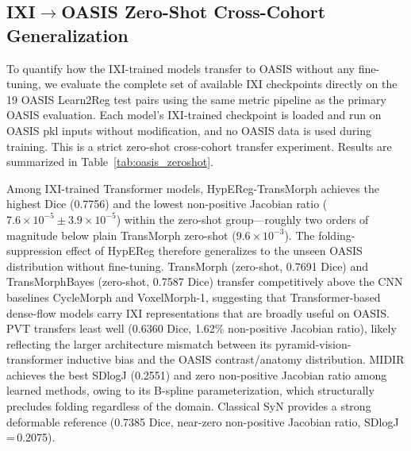 \documentclass[jimaging,article,submit,pdftex,moreauthors]{Definitions/mdpi}
\begin{document}
\begin{table}[H]
\end{table}

\subsection{IXI\texorpdfstring{\(\to\)}{→}OASIS Zero-Shot Cross-Cohort Generalization}\label{sec:oasis_zs}
To quantify how the IXI-trained models transfer to OASIS without any fine-tuning, we evaluate the complete set of available IXI checkpoints directly on the 19 OASIS Learn2Reg test pairs using the same metric pipeline as the primary OASIS evaluation. Each model's IXI-trained checkpoint is loaded and run on OASIS pkl inputs without modification, and no OASIS data is used during training. This is a strict zero-shot cross-cohort transfer experiment. Results are summarized in Table~\ref{tab:oasis_zeroshot}.

Among IXI-trained Transformer models, HypEReg-TransMorph achieves the highest Dice (0.7756) and the lowest non-positive Jacobian ratio (\(7.6\times10^{-5}\pm3.9\times10^{-5}\)) within the zero-shot group---roughly two orders of magnitude below plain TransMorph zero-shot (\(9.6\times10^{-3}\)). The folding-suppression effect of HypEReg therefore generalizes to the unseen OASIS distribution without fine-tuning. TransMorph (zero-shot, 0.7691 Dice) and TransMorphBayes (zero-shot, 0.7587 Dice) transfer competitively above the CNN baselines CycleMorph and VoxelMorph-1, suggesting that Transformer-based dense-flow models carry IXI representations that are broadly useful on OASIS. PVT transfers least well (0.6360 Dice, 1.62\% non-positive Jacobian ratio), likely reflecting the larger architecture mismatch between its pyramid-vision-transformer inductive bias and the OASIS contrast/anatomy distribution. MIDIR achieves the best SDlogJ (0.2551) and zero non-positive Jacobian ratio among learned methods, owing to its B-spline parameterization, which structurally precludes folding regardless of the domain. Classical SyN provides a strong deformable reference (0.7385 Dice, near-zero non-positive Jacobian ratio, SDlogJ\,=\,0.2075).
\end{document}
